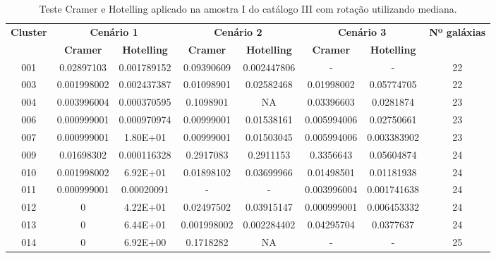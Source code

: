 {\scriptsize
\begin{longtable}{cccccccc}
\caption{Teste Cramer e Hotelling aplicado na amostra I do catálogo III com rotação utilizando mediana.}\label{tab:sorirotation2}
\hline
\multirow{2}{*}{\textbf{Cluster}} & \multicolumn{2}{|c|}{\textbf{Cenário 1}} & \multicolumn{2}{c|}{\textbf{Cenário 2}} & \multicolumn{2}{c|}{\textbf{Cenário 3}} & \multirow{2}{*}{\textbf{Nº galáxias}} \\ \cline{2-7}
                         & \multicolumn{1}{|c}{\textbf{Cramer}}       & \textbf{Hotelling}       & \textbf{Cramer}       & \textbf{Hotelling}       & \textbf{Cramer}       & \textbf{Hotelling}                              \\ \hline
001 & {\color{red}0.02897103} & {\color{red}0.001789152} & 0.09390609 & {\color{red}0.002447806} & - & - &  22 \\  
003 & {\color{red}0.001998002} & {\color{red}0.002437387} & {\color{red}0.01098901} & {\color{red}0.02582468} & {\color{red}0.01998002} & 0.05774705 & 22 \\
004 & {\color{red}0.003996004} & {\color{red}0.000370595} & 0.1098901 & NA & {\color{red}0.03396603} & {\color{red}0.0281874} & 23 \\
006 & {\color{red}0.000999001} & {\color{red}0.000970974} & {\color{red}0.00999001} & {\color{red}0.01538161} & {\color{red}0.005994006} & {\color{red}0.02750661} & 23 \\
007 & {\color{red}0.000999001} & 1.80E+01 & {\color{red}0.00999001} & {\color{red}0.01503045} & {\color{red}0.005994006} & {\color{red}0.003383902} & 23 \\
009 & {\color{red}0.01698302} & {\color{red}0.000116328} & 0.2917083 & 0.2911153 & 0.3356643 & 0.05604874 & 24 \\
010 & {\color{red}0.001998002} & 6.92E+01 & {\color{red}0.01898102} & {\color{red}0.03699966} & {\color{red}0.01498501} & {\color{red}0.01181938} & 24 \\
011 & {\color{red}0.000999001} & {\color{red}0.00020091} & - & - &  {\color{red}0.003996004} & {\color{red}0.001741638} & 24 \\
012 & {\color{red}0} & 4.22E+01 & {\color{red}0.02497502} & {\color{red}0.03915147} & {\color{red}0.000999001} & {\color{red}0.006453332} & 24 \\
013 & 0 & 6.44E+01 & 0.001998002 & 0.002284402 & 0.04295704 & 0.0377637 & 24 \\
014 & {\color{red}0} & 6.92E+00 & 0.1718282 & NA & - & - & 25 \\

\end{longtable}}
